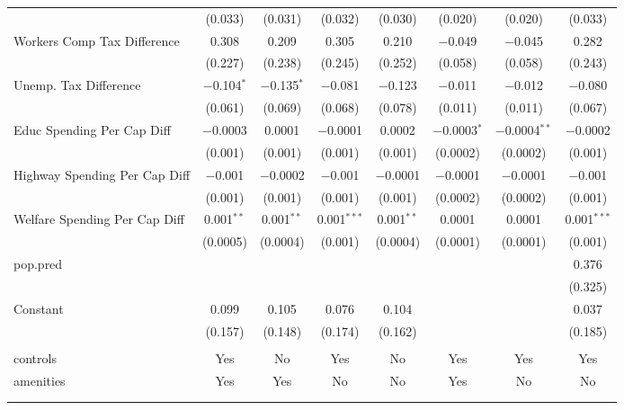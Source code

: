 \begin{table}[!htbp]
\begin{tabular}{@{\extracolsep{5pt}}lccccccc}
  & (0.033) & (0.031) & (0.032) & (0.030) & (0.020) & (0.020) & (0.033) \\ 
  Workers Comp Tax Difference & 0.308 & 0.209 & 0.305 & 0.210 & $-$0.049 & $-$0.045 & 0.282 \\ 
  & (0.227) & (0.238) & (0.245) & (0.252) & (0.058) & (0.058) & (0.243) \\ 
  Unemp. Tax Difference & $-$0.104$^{*}$ & $-$0.135$^{*}$ & $-$0.081 & $-$0.123 & $-$0.011 & $-$0.012 & $-$0.080 \\ 
  & (0.061) & (0.069) & (0.068) & (0.078) & (0.011) & (0.011) & (0.067) \\ 
  Educ Spending Per Cap Diff & $-$0.0003 & 0.0001 & $-$0.0001 & 0.0002 & $-$0.0003$^{*}$ & $-$0.0004$^{**}$ & $-$0.0002 \\ 
  & (0.001) & (0.001) & (0.001) & (0.001) & (0.0002) & (0.0002) & (0.001) \\ 
  Highway Spending Per Cap Diff & $-$0.001 & $-$0.0002 & $-$0.001 & $-$0.0001 & $-$0.0001 & $-$0.0001 & $-$0.001 \\ 
  & (0.001) & (0.001) & (0.001) & (0.001) & (0.0002) & (0.0002) & (0.001) \\ 
  Welfare Spending Per Cap Diff & 0.001$^{**}$ & 0.001$^{**}$ & 0.001$^{***}$ & 0.001$^{**}$ & 0.0001 & 0.0001 & 0.001$^{***}$ \\ 
  & (0.0005) & (0.0004) & (0.001) & (0.0004) & (0.0001) & (0.0001) & (0.001) \\ 
  pop.pred &  &  &  &  &  &  & 0.376 \\ 
  &  &  &  &  &  &  & (0.325) \\ 
  Constant & 0.099 & 0.105 & 0.076 & 0.104 &  &  & 0.037 \\ 
  & (0.157) & (0.148) & (0.174) & (0.162) &  &  & (0.185) \\ 
 \hline \\[-1.8ex] 
controls & Yes & No & Yes & No & Yes & Yes & Yes \\ 
amenities & Yes & Yes & No & No & Yes & No & No \\ 
\hline \\[-1.8ex] 
\hline 
\hline \\[-1.8ex] 
\end{tabular} 
\end{table} 
